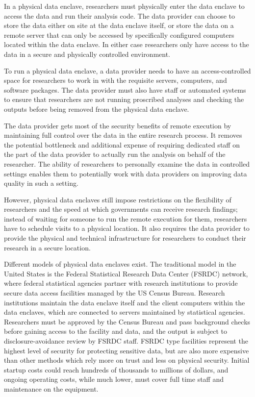 In a physical data enclave, researchers must physically enter the data
enclave to access the data and run their analysis code. The data
provider can choose to store the data either on site at the data enclave
itself, or store the data on a remote server that can only be accessed
by specifically configured computers located within the data enclave. In
either case researchers only have access to the data in a secure and
physically controlled environment.

To run a physical data enclave, a data provider needs to have an
access-controlled space for researchers to work in with the requisite
servers, computers, and software packages. The data provider must also
have staff or automated systems to ensure that researchers are not
running proscribed analyses and checking the outputs before being
removed from the physical data enclave.

The data provider gets most of the security benefits of remote execution
by maintaining full control over the data in the entire research
process. It removes the potential bottleneck and additional expense of
requiring dedicated staff on the part of the data provider to actually
run the analysis on behalf of the researcher. The ability of researchers
to personally examine the data in controlled settings enables them to
potentially work with data providers on improving data quality in such a
setting.

However, physical data enclaves still impose restrictions on the
flexibility of researchers and the speed at which governments can
receive research findings; instead of waiting for someone to run the
remote execution for them, researchers have to schedule visits to a
physical location. It also requires the data provider to provide the
physical and technical infrastructure for researchers to conduct their
research in a secure location.

Different models of physical data enclaves exist. The traditional model
in the United States is the Federal Statistical Research Data Center
(FSRDC) network, where federal statistical agencies partner with
research institutions to provide secure data access facilities managed
by the US Census Bureau. Research institutions maintain the data enclave
itself and the client computers within the data enclaves, which are
connected to servers maintained by statistical agencies. Researchers
must be approved by the Census Bureau and pass background checks before
gaining access to the facility and data, and the output is subject to
disclosure-avoidance review by FSRDC staff. FSRDC type facilities
represent the highest level of security for protecting sensitive data,
but are also more expensive than other methods which rely more on trust
and less on physical security. Initial startup costs could reach
hundreds of thousands to millions of dollars, and ongoing operating
costs, while much lower, must cover full time staff and maintenance on
the equipment.

